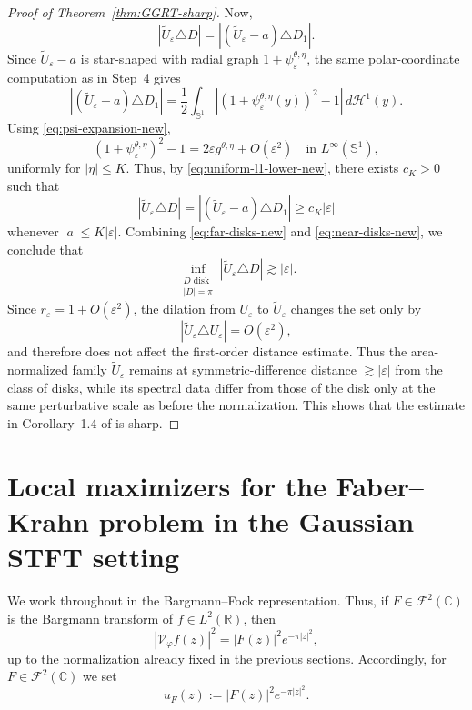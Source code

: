 \documentclass[a4paper,11pt,reqno]{amsart}
\numberwithin{equation}{section}
\theoremstyle{plain} %
\theoremstyle{definition} %
\theoremstyle{remark}
\newcommand{\R}{\mathbb{R}}
\newcommand{\C}{\mathbb{C}}
\begin{document}
\begin{proof}[Proof of Theorem~\ref{thm:GGRT-sharp}]
Now,
\[
|\widetilde U_\varepsilon \triangle D|
=
|(\widetilde U_\varepsilon-a)\triangle D_1|.
\]
Since $\widetilde U_\varepsilon-a$ is star-shaped with radial graph
$1+\psi_\varepsilon^{\theta,\eta}$, the same polar-coordinate computation as in
Step~4 gives
\[
|(\widetilde U_\varepsilon-a)\triangle D_1|
=
\frac12\int_{\mathbb S^1}
\left|(1+\psi_\varepsilon^{\theta,\eta}(y))^2-1\right|
\,d\mathcal H^1(y).
\]
Using \eqref{eq:psi-expansion-new},
\[
(1+\psi_\varepsilon^{\theta,\eta})^2-1
=
2\varepsilon g^{\theta,\eta}+O(\varepsilon^2)
\quad \text{in } L^\infty(\mathbb S^1),
\]
uniformly for $|\eta|\leq K$. Thus, by \eqref{eq:uniform-l1-lower-new},
there exists $c_K>0$ such that
\begin{equation}\label{eq:near-disks-new}
|\widetilde U_\varepsilon \triangle D|
=
|(\widetilde U_\varepsilon-a)\triangle D_1|
\geq
c_K |\varepsilon|
\end{equation}
whenever $|a|\leq K|\varepsilon|$. Combining \eqref{eq:far-disks-new} and \eqref{eq:near-disks-new}, we conclude
that
\[
\inf_{\substack{D \text{ disk}\\ |D|=\pi}}
|\widetilde U_\varepsilon \triangle D|
\gtrsim |\varepsilon|.
\]
Since \(r_\varepsilon=1+O(\varepsilon^2)\), the dilation from \(U_\varepsilon\)
to \(\widetilde U_\varepsilon\) changes the set only by
\[
|\widetilde U_\varepsilon\triangle U_\varepsilon|=O(\varepsilon^2),
\]
and therefore does not affect the first-order distance estimate. Thus the
area-normalized family \(\widetilde U_\varepsilon\) remains at
symmetric-difference distance \(\gtrsim |\varepsilon|\) from the class of
disks, while its spectral data differ from those of the disk only at the same
perturbative scale as before the normalization. This shows that the estimate in
Corollary~1.4 of \cite{Gomez-Guerra-Ramos-Tilli} is sharp.

\end{proof}

\section{Local maximizers for the Faber--Krahn problem in the Gaussian STFT setting}

We work throughout in the Bargmann--Fock representation. Thus, if \(F\in \mathcal F^2(\C)\)
is the Bargmann transform of \(f\in L^2(\R)\), then
\[
|\mathcal V_\varphi f(z)|^2 = |F(z)|^2 e^{-\pi |z|^2},
\]
up to the normalization already fixed in the previous sections. Accordingly, for
\(F\in \mathcal F^2(\C)\) we set
\[
u_F(z):=|F(z)|^2 e^{-\pi |z|^2}.
\]
\end{document}
